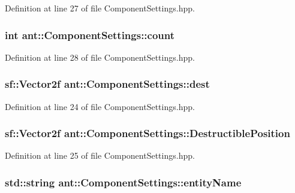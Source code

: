 Definition at line 27 of file Component\+Settings.\+hpp.

\hypertarget{classant_1_1_component_settings_a38cc2b2e94b54f023df27b3553af19ed}{
\subsubsection[{count}]{\setlength{\rightskip}{0pt plus 5cm}int ant\+::\+Component\+Settings\+::count}}\label{classant_1_1_component_settings_a38cc2b2e94b54f023df27b3553af19ed}


Definition at line 28 of file Component\+Settings.\+hpp.

\hypertarget{classant_1_1_component_settings_a17c51bba2be5a2a29db30c2aea842f23}{
\subsubsection[{dest}]{\setlength{\rightskip}{0pt plus 5cm}sf\+::\+Vector2f ant\+::\+Component\+Settings\+::dest}}\label{classant_1_1_component_settings_a17c51bba2be5a2a29db30c2aea842f23}


Definition at line 24 of file Component\+Settings.\+hpp.

\hypertarget{classant_1_1_component_settings_a29c818f14771a383adda38637635235c}{
\subsubsection[{Destructible\+Position}]{\setlength{\rightskip}{0pt plus 5cm}sf\+::\+Vector2f ant\+::\+Component\+Settings\+::\+Destructible\+Position}}\label{classant_1_1_component_settings_a29c818f14771a383adda38637635235c}


Definition at line 25 of file Component\+Settings.\+hpp.

\hypertarget{classant_1_1_component_settings_ad2d40618bceb1e55dcefd5ed9770a3da}{
\subsubsection[{entity\+Name}]{\setlength{\rightskip}{0pt plus 5cm}std\+::string ant\+::\+Component\+Settings\+::entity\+Name}}\label{classant_1_1_component_settings_ad2d40618bceb1e55dcefd5ed9770a3da}


